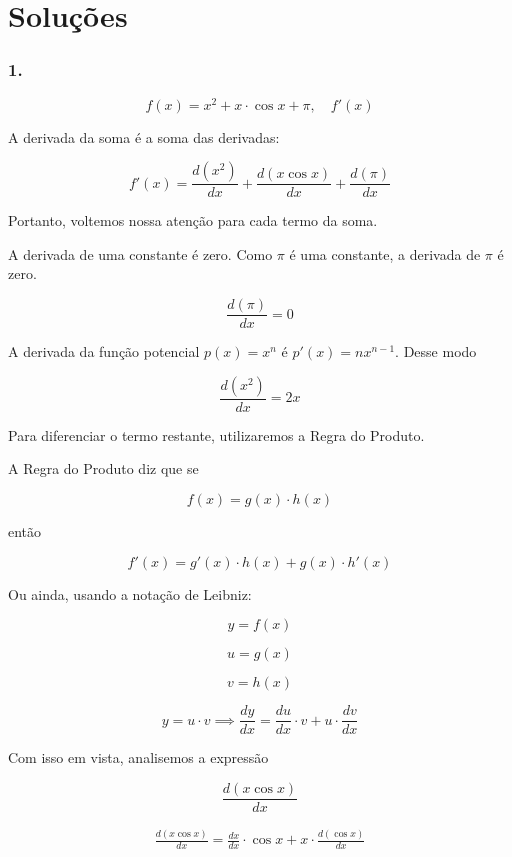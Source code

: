 \documentclass{article}
\begin{document}
\section*{Soluções}

\subsubsection*{1.}

\[
    f(x) = x^2 + x \cdot \cos x + \pi , \quad f'(x)
\]

A derivada da soma é a soma das derivadas:

\begin{equation}\label{eq:q1_soma}
    f'(x) = \frac{d (x^2)}{dx} + \frac{d (x\cos x)}{dx} + \frac{d(\pi)}{dx}
\end{equation}

Portanto, voltemos nossa atenção para cada termo da soma.

A derivada de uma constante é zero. Como \(\pi\) é uma constante, a derivada de \(\pi\) é zero.

\begin{equation}\label{eq:derivative_pi_is_zero}
    \frac{d(\pi)}{dx} = 0
\end{equation}

A derivada da função potencial \(p(x) = x^n\) é  \(p'(x) = nx^{n-1}\). Desse modo

\begin{equation}\label{eq:derivative_x_to_the_2}
    \frac{d(x^2)}{dx} = 2x
\end{equation}

Para diferenciar o termo restante, utilizaremos a Regra do Produto.

A Regra do Produto diz que se

\[
    f(x) = g(x)\cdot h(x)
\]

então

\[
    f'(x) = g'(x)\cdot h(x) + g(x)\cdot h'(x)
\]

Ou ainda, usando a notação de Leibniz:

\[
    y = f(x)
\]

\[
    u = g(x)
\]

\[
    v = h(x)
\]

\[
    y = u\cdot v \implies \frac{dy}{dx} = \frac{du}{dx} \cdot v + u \cdot \frac{dv}{dx}
\]

Com isso em vista, analisemos a expressão

\[
    \frac{d (x\cos x)}{dx}
\]

\begin{align*}
    \frac{d (x\cos x)}{dx} = \frac{dx}{dx} \cdot \cos x + x \cdot \frac{d (\cos x)}{dx}
\end{align*}
\end{document}
